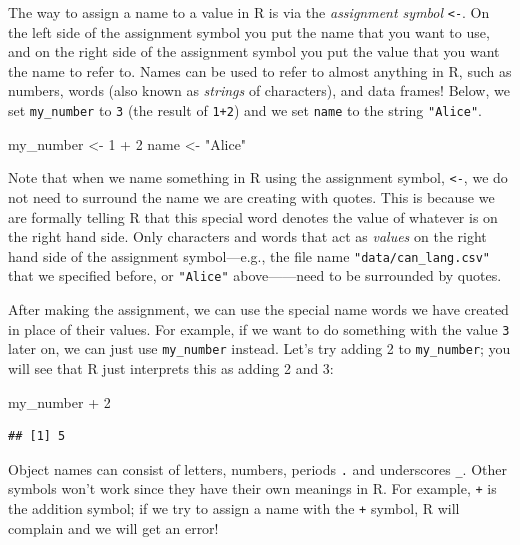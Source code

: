 \documentclass[
]{book}
\newenvironment{Shaded}{\begin{snugshade}}{\end{snugshade}}
\newcommand{\DecValTok}[1]{\textcolor[rgb]{0.06,0.06,0.06}{#1}}
\newcommand{\NormalTok}[1]{#1}
\newcommand{\OtherTok}[1]{\textcolor[rgb]{0.37,0.37,0.37}{#1}}
\newcommand{\SpecialCharTok}[1]{\textcolor[rgb]{0,0,0}{#1}}
\newcommand{\StringTok}[1]{\textcolor[rgb]{0.5,0.5,0.5}{#1}}
\begin{document}
The way to assign a name to a value in R is via the \emph{assignment symbol} \texttt{\textless{}-}.
On the left side of the assignment symbol you put the name that you want
to use, and on the right side of the assignment symbol
you put the value that you want the name to refer to.
Names can be used to refer to almost anything in R, such as numbers,
words (also known as \emph{strings} of characters), and data frames!
Below, we set \texttt{my\_number} to \texttt{3} (the result of \texttt{1+2})
and we set \texttt{name} to the string \texttt{"Alice"}. 

\begin{Shaded}
\begin{Highlighting}[]
\NormalTok{my\_number }\OtherTok{\textless{}{-}} \DecValTok{1} \SpecialCharTok{+} \DecValTok{2}
\NormalTok{name }\OtherTok{\textless{}{-}} \StringTok{"Alice"}
\end{Highlighting}
\end{Shaded}

Note that when
we name something in R using the assignment symbol, \texttt{\textless{}-},
we do not need to surround the name we are creating with quotes. This is
because we are formally telling R that this special word denotes
the value of whatever is on the right hand side.
Only characters and words that act as \emph{values} on the right hand side of the assignment
symbol---e.g., the file name \texttt{"data/can\_lang.csv"} that we specified before, or \texttt{"Alice"} above------need
to be surrounded by quotes.

After making the assignment, we can use the special name words we have created in
place of their values. For example, if we want to do something with the value \texttt{3} later on,
we can just use \texttt{my\_number} instead. Let's try adding 2 to \texttt{my\_number}; you will see that
R just interprets this as adding 2 and 3:

\begin{Shaded}
\begin{Highlighting}[]
\NormalTok{my\_number }\SpecialCharTok{+} \DecValTok{2}
\end{Highlighting}
\end{Shaded}

\begin{verbatim}
## [1] 5
\end{verbatim}

Object names  can consist of letters, numbers, periods \texttt{.} and underscores \texttt{\_}.
Other symbols won't work since they have their own meanings in R. For example,
\texttt{+} is the addition symbol; if we try to assign a name with
the \texttt{+} symbol, R will complain and we will get an error!
\end{document}
